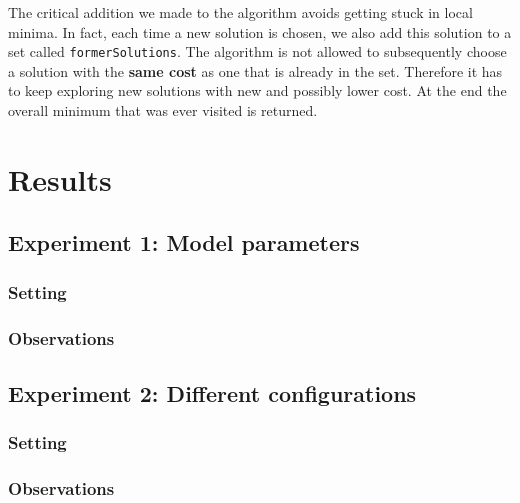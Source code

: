 \documentclass[11pt]{article}
\begin{document}
The critical addition we made to the algorithm avoids getting stuck in local
minima. In fact, each time a new solution is chosen, we also add this solution
to a set called \texttt{formerSolutions}. The algorithm is not allowed to
subsequently choose a solution with the \textbf{same cost} as one that is
already in the set. Therefore it has to keep exploring new solutions with new
and possibly lower cost. At the end the overall minimum that was ever visited is
returned.


\section{Results}

\subsection{Experiment 1: Model parameters}

\subsubsection{Setting} 

\subsubsection{Observations}

\subsection{Experiment 2: Different configurations}

\subsubsection{Setting}

\subsubsection{Observations}
\end{document}
